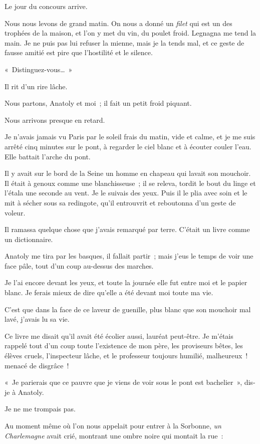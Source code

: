 \documentclass[french,twoside]{book} %
\begin{document}
Le jour du concours arrive.\par
Nous nous levons de grand matin. On nous a donné un \emph{filet} qui est un des trophées de la maison, et l’on y met du vin, du poulet froid. Legnagna me tend la main. Je ne puis pas lui refuser la mienne, mais je la tends mal, et ce geste de fausse amitié est pire que l’hostilité et le silence.\par
« Distinguez-vous… »\par
Il rit d’un rire lâche.\par
Nous partons, Anatoly et moi ; il fait un petit froid piquant.\par
\bigbreak
\noindent Nous arrivons presque en retard.\par
Je n’avais jamais vu Paris par le soleil frais du matin, vide et calme, et je me suis arrêté cinq minutes sur le pont, à regarder le ciel blanc et à écouter couler l’eau. Elle battait l’arche du pont.\par
Il y avait sur le bord de la Seine un homme en chapeau qui lavait son mouchoir. Il était à genoux comme une blanchisseuse ; il se releva, tordit le bout du linge et l’étala une seconde au vent. Je le suivais des yeux. Puis il le plia avec soin et le mit à sécher sous sa redingote, qu’il entrouvrit et reboutonna d’un geste de voleur.\par
Il ramassa quelque chose que j’avais remarqué par terre. C’était un livre comme un dictionnaire.\par
Anatoly me tira par les basques, il fallait partir ; mais j’eus le temps de voir une face pâle, tout d’un coup au-dessus des marches.\par
Je l’ai encore devant les yeux, et toute la journée elle fut entre moi et le papier blanc. Je ferais mieux de dire qu’elle a été devant moi toute ma vie.\par
\bigbreak
\noindent C’est que dans la face de ce laveur de guenille, plus blanc que son mouchoir mal lavé, j’avais lu sa vie.\par
Ce livre me disait qu’il avait été écolier aussi, lauréat peut-être. Je m’étais rappelé tout d’un coup toute l’existence de mon père, les proviseurs bêtes, les élèves cruels, l’inspecteur lâche, et le professeur toujours humilié, malheureux ! menacé de disgrâce !\par
« Je parierais que ce pauvre que je viens de voir sous le pont est bachelier », dis-je à Anatoly.\par
Je ne me trompais pas.\par
Au moment même où l’on nous appelait pour entrer à la Sorbonne, \emph{un Charlemagne} avait crié, montrant une ombre noire qui montait la rue :\par
\end{document}
